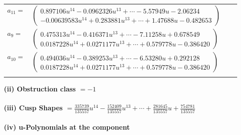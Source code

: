 \documentclass[1p]{elsarticle_modified}
\theoremstyle{definition}
\begin{document}
\begin{tabular}{m{7pt} m{180pt} m{7pt} m{180pt} }
\flushright $a_{11}=$&$\begin{pmatrix}0.897106 u^{14}-0.0962326 u^{13}+\cdots-5.57949 u-2.06234\\-0.00639583 u^{14}+0.283881 u^{13}+\cdots+1.47688 u-0.482653\end{pmatrix}$ \\
\flushright $a_{9}=$&$\begin{pmatrix}0.475313 u^{14}-0.416371 u^{13}+\cdots-7.11258 u+0.678549\\0.0187228 u^{14}+0.0271177 u^{13}+\cdots+0.579778 u-0.386420\end{pmatrix}$ \\
\flushright $a_{10}=$&$\begin{pmatrix}0.494036 u^{14}-0.389253 u^{13}+\cdots-6.53280 u+0.292128\\0.0187228 u^{14}+0.0271177 u^{13}+\cdots+0.579778 u-0.386420\end{pmatrix}$\\&\end{tabular}
\flushleft \textbf{(ii) Obstruction class $= -1$}\\~\\
\flushleft \textbf{(iii) Cusp Shapes $= \frac{335739}{135557} u^{14}-\frac{152409}{135557} u^{13}+\cdots+\frac{281645}{135557} u+\frac{754781}{135557}$}\\~\\
\newpage\renewcommand{\arraystretch}{1}
\flushleft \textbf{(iv) u-Polynomials at the component}\newline \\
\end{document}
